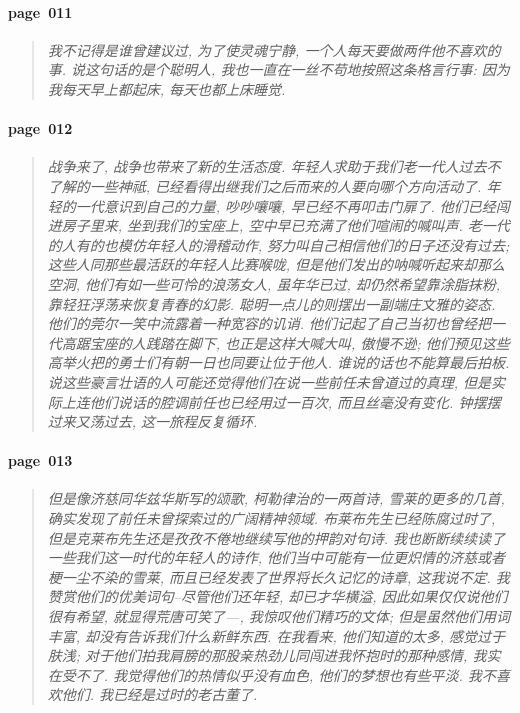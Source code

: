 \paragraph*{page~011}
\begin{quotation}
    \itshape
    我不记得是谁曾建议过, 为了使灵魂宁静, 一个人每天要做两件他不喜欢的事. 说这句话的是个聪明人, 我也一直在一丝不苟地按照这条格言行事: 因为我每天早上都起床, 每天也都上床睡觉.
\end{quotation}

\paragraph*{page~012}
\begin{quotation}
    \itshape
    战争来了, 战争也带来了新的生活态度. 年轻人求助于我们老一代人过去不了解的一些神祗, 已经看得出继我们之后而来的人要向哪个方向活动了. 年轻的一代意识到自己的力量, 吵吵嚷嚷, 早已经不再叩击门扉了. 他们已经闯进房子里来, 坐到我们的宝座上, 空中早已充满了他们喧闹的喊叫声. 老一代的人有的也模仿年轻人的滑稽动作, 努力叫自己相信他们的日子还没有过去; 这些人同那些最活跃的年轻人比赛喉咙, 但是他们发出的呐喊听起来却那么空洞, 他们有如一些可怜的浪荡女人, 虽年华已过, 却仍然希望靠涂脂抹粉, 靠轻狂浮荡来恢复青春的幻影. 聪明一点儿的则摆出一副端庄文雅的姿态. 他们的莞尔一笑中流露着一种宽容的讥诮. 他们记起了自己当初也曾经把一代高踞宝座的人践踏在脚下, 也正是这样大喊大叫, 傲慢不逊; 他们预见这些高举火把的勇士们有朝一日也同要让位于他人. 谁说的话也不能算最后拍板. 说这些豪言壮语的人可能还觉得他们在说一些前任未曾道过的真理, 但是实际上连他们说话的腔调前任也已经用过一百次, 而且丝毫没有变化. 钟摆摆过来又荡过去, 这一旅程反复循环. 
\end{quotation}

\paragraph*{page~013}
\begin{quotation}
    \itshape
    但是像济慈同华兹华斯写的颂歌, 柯勒律治的一两首诗, 雪莱的更多的几首, 确实发现了前任未曾探索过的广阔精神领域. 布莱布先生已经陈腐过时了, 但是克莱布先生还是孜孜不倦地继续写他的押韵对句诗. 我也断断续续读了一些我们这一时代的年轻人的诗作, 他们当中可能有一位更炽情的济慈或者梗一尘不染的雪莱, 而且已经发表了世界将长久记忆的诗章, 这我说不定. 我赞赏他们的优美词句--尽管他们还年轻, 却已才华横溢, 因此如果仅仅说他们很有希望, 就显得荒唐可笑了---, 我惊叹他们精巧的文体; 但是虽然他们用词丰富, 却没有告诉我们什么新鲜东西. 在我看来, 他们知道的太多, 感觉过于肤浅; 对于他们拍我肩膀的那股亲热劲儿同闯进我怀抱时的那种感情, 我实在受不了. 我觉得他们的热情似乎没有血色, 他们的梦想也有些平淡. 我不喜欢他们. 我已经是过时的老古董了.
\end{quotation}

